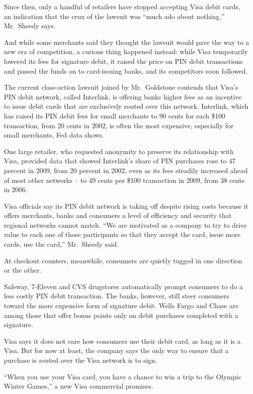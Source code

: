 ﻿\documentclass[12pt]{article}
\begin{document}
Since then, only a handful of retailers have stopped accepting Visa debit cards, an indication that
the crux of the lawsuit was ``much ado about nothing,'' Mr.~Sheedy says.

And while some merchants said they thought the lawsuit would pave the way to a new era of
competition, a curious thing happened instead: while Visa temporarily lowered its fees for signature
debit, it raised the price on PIN debit transactions and passed the funds on to card-issuing banks,
and its competitors soon followed.

The current class-action lawsuit joined by Mr.~Goldstone contends that Visa's PIN debit network,
called Interlink, is offering banks higher fees as an incentive to issue debit cards that are
exclusively routed over this network. Interlink, which has raised its PIN debit fees for small
merchants to 90 cents for each \$100 transaction, from 20 cents in 2002, is often the most
expensive, especially for small merchants, Fed data shows.

One large retailer, who requested anonymity to preserve its relationship with Visa, provided data
that showed Interlink's share of PIN purchases rose to 47 percent in 2009, from 20 percent in 2002,
even as its fees steadily increased ahead of most other networks -- to 49 cents per \$100
transaction in 2009, from 38 cents in 2006.

Visa officials say its PIN debit network is taking off despite rising costs because it offers
merchants, banks and consumers a level of efficiency and security that regional networks cannot
match. ``We are motivated as a company to try to drive value to each one of those participants so
that they accept the card, issue more cards, use the card,'' Mr.~Sheedy said.

At checkout counters, meanwhile, consumers are quietly tugged in one direction or the other.

Safeway, 7-Eleven and CVS drugstores automatically prompt consumers to do a less costly PIN debit
transaction. The banks, however, still steer consumers toward the more expensive form of signature
debit. Wells Fargo and Chase are among those that offer bonus points only on debit purchases
completed with a signature.

Visa says it does not care how consumers use their debit card, as long as it is a Visa. But for now
at least, the company says the only way to ensure that a purchase is routed over the Visa network is
to sign.

``When you use your Visa card, you have a chance to win a trip to the Olympic Winter Games,'' a new
Visa commercial promises.
\end{document}
